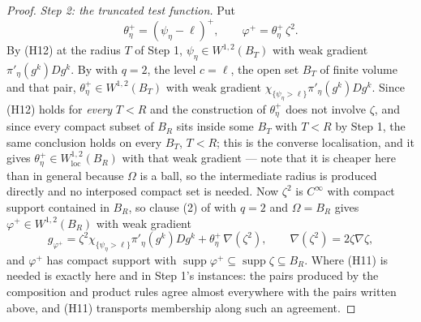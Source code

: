\begin{proof}
\emph{Step 2: the truncated test function.}  Put
\[
\theta^+_\eta=(\psi_\eta-\ell)^+,\qquad \varphi^+=\theta^+_\eta\,\zeta^2 .
\]
By (H12) at the radius $T$ of Step 1, $\psi_\eta\in W^{1,2}(B_T)$ with weak
gradient $\pi'_\eta(g^k)Dg^k$.  By  with
$q=2$, the level $c=\ell$, the open set $B_T$ of finite volume and that pair,
$\theta^+_\eta\in W^{1,2}(B_T)$ with weak gradient
$\chi_{\{\psi_\eta>\ell\}}\pi'_\eta(g^k)Dg^k$.  Since (H12) holds for
\emph{every} $T<R$ and the construction of $\theta^+_\eta$ does not involve
$\zeta$, and since every compact subset of $B_R$ sits inside some $B_T$ with
$T<R$ by Step 1, the same conclusion holds on every $B_T$, $T<R$; this is the
converse localisation, and it gives
$\theta^+_\eta\in W^{1,2}_{\mathrm{loc}}(B_R)$ with that weak gradient --- note
that it is cheaper here than in general because $\Omega$ is a ball, so the
intermediate radius is produced directly and no interposed compact set is
needed.  Now $\zeta^2$ is $C^\infty$ with compact support contained in $B_R$,
so clause (2) of  with $q=2$ and $\Omega=B_R$
gives $\varphi^+\in W^{1,2}(B_R)$ with weak gradient
\[
g_{\varphi^+}=\zeta^2\chi_{\{\psi_\eta>\ell\}}\pi'_\eta(g^k)Dg^k
+\theta^+_\eta\,\nabla(\zeta^2),
\qquad \nabla(\zeta^2)=2\zeta\nabla\zeta ,
\]
and $\varphi^+$ has compact support with
$\operatorname{supp}\varphi^+\subseteq\operatorname{supp}\zeta\subseteq B_R$.
Where (H11) is needed is exactly here and in Step 1's instances: the pairs
produced by the composition and product rules agree almost everywhere with the
pairs written above, and (H11) transports membership along such an agreement.


\end{proof}
